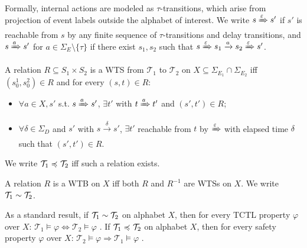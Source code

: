 Formally, internal actions are modeled as $\tau$-transitions, 
which arise from projection of event labels outside the alphabet 
of interest. We write $s \xRightarrow{\varepsilon} s'$ if $s'$ is 
reachable from $s$ by any finite sequence of $\tau$-transitions 
and delay transitions, and $s \xRightarrow{a} s'$ for $a \in 
\Sigma_E \setminus \{\tau\}$ if there exist $s_1, s_2$ such that 
$s \xRightarrow{\varepsilon} s_1 \xrightarrow{a} s_2 
\xRightarrow{\varepsilon} s'$.

\begin{definition}
A relation $R \subseteq S_1 \times S_2$ is a WTS 
from $\mathcal{T}_1$ to $\mathcal{T}_2$ on $X \subseteq 
\Sigma_{E_1} \cap \Sigma_{E_2}$ iff $(s^1_0, s^2_0) \in R$ and for every $(s, t) \in R$:
\begin{itemize}
\item $\forall a \in X,s'$ s.t. $s \xRightarrow{a} s'$, 
     $\exists t'$ with $t \xRightarrow{a} t'$ and 
    $(s', t') \in R$;
\item $\forall \delta \in \Sigma_D$ and $s'$ with $s 
\xrightarrow{\delta} s'$,  $\exists t'$ reachable from 
$t$ by $\xRightarrow{\varepsilon}$ with elapsed time $\delta$ 
    such that $(s', t') \in R$.
\end{itemize}
We write $\mathcal{T}_1 \preccurlyeq_{} \mathcal{T}_2$ iff such a 
relation exists.
\end{definition}

\begin{definition}
A relation $R$ is a WTB on $X$ iff 
both $R$ and $R^{-1}$ are WTSs on $X$. We write 
$\mathcal{T}_1 \stackrel{}{\sim} \mathcal{T}_2$.
\end{definition}

As a standard result, if $\mathcal{T}_1 \stackrel{}{\sim} \mathcal{T}_2$ on alphabet $X$, then for every TCTL property $\varphi$ over $X$: $\mathcal{T}_1 \models \varphi \iff \mathcal{T}_2 \models \varphi$ \cite{Baier08}. If $\mathcal{T}_1 \preccurlyeq_{} \mathcal{T}_2$ on alphabet $X$, then for every safety property $\varphi$ over $X$: $\mathcal{T}_2 \models \varphi \Rightarrow \mathcal{T}_1 \models \varphi$ \cite{Baier08}.

